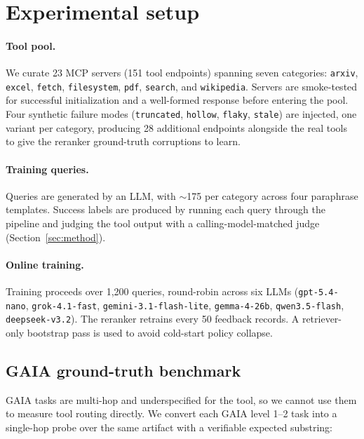 \section{Experimental setup}
\label{sec:experiments}

\paragraph{Tool pool.}
We curate 23 MCP servers (151 tool endpoints) spanning seven categories: \texttt{arxiv}, \texttt{excel}, \texttt{fetch}, \texttt{filesystem}, \texttt{pdf}, \texttt{search}, and \texttt{wikipedia}. Servers are smoke-tested for successful initialization and a well-formed response before entering the pool. Four synthetic failure modes (\texttt{truncated}, \texttt{hollow}, \texttt{flaky}, \texttt{stale}) are injected, one variant per category, producing 28 additional endpoints alongside the real tools to give the reranker ground-truth corruptions to learn.

\paragraph{Training queries.}
Queries are generated by an LLM, with $\sim$175 per category across four paraphrase templates. Success labels are produced by running each query through the pipeline and judging the tool output with a calling-model-matched judge (Section~\ref{sec:method}).

\paragraph{Online training.}
Training proceeds over 1{,}200 queries, round-robin across six LLMs (\texttt{gpt-5.4-nano}, \texttt{grok-4.1-fast}, \texttt{gemini-3.1-flash-lite}, \texttt{gemma-4-26b}, \texttt{qwen3.5-flash}, \texttt{deepseek-v3.2}). The reranker retrains every 50 feedback records. A retriever-only bootstrap pass is used to avoid cold-start policy collapse.

\subsection{GAIA ground-truth benchmark}
\label{sec:gaia-gt}

GAIA tasks are multi-hop and underspecified for the tool, so we cannot use them to measure tool routing directly. We convert each GAIA level 1--2 task into a single-hop probe over the same artifact with a verifiable expected substring:

